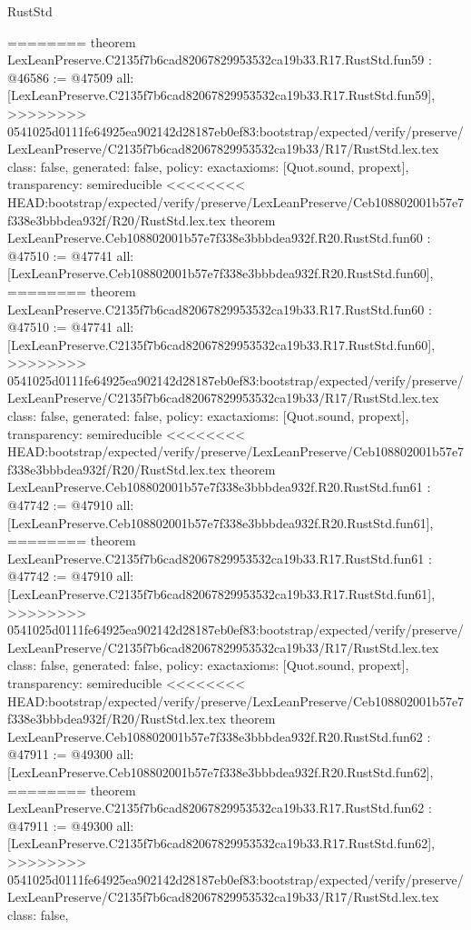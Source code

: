 \begin{lexlean}{RustStd}
\begin{coremodule}
{\begin{coremodule}
{{{{{{{{{{{{{{{{{{{{{{{{{{{{{{{{{{{{{{{{{{{{{{{{{{{{{{{{{{{{{{========
theorem LexLeanPreserve.C2135f7b6cad82067829953532ca19b33.R17.RustStd.fun59 : @46586 := @47509 {
  all: [LexLeanPreserve.C2135f7b6cad82067829953532ca19b33.R17.RustStd.fun59],
>>>>>>>> 0541025d0111fe64925ea902142d28187eb0ef83:bootstrap/expected/verify/preserve/LexLeanPreserve/C2135f7b6cad82067829953532ca19b33/R17/RustStd.lex.tex
  class: false,
  generated: false,
  policy: exact{axioms: [Quot.sound, propext]},
  transparency: semireducible
}
<<<<<<<< HEAD:bootstrap/expected/verify/preserve/LexLeanPreserve/Ceb108802001b57e7f338e3bbbdea932f/R20/RustStd.lex.tex
theorem LexLeanPreserve.Ceb108802001b57e7f338e3bbbdea932f.R20.RustStd.fun60 : @47510 := @47741 {
  all: [LexLeanPreserve.Ceb108802001b57e7f338e3bbbdea932f.R20.RustStd.fun60],
========
theorem LexLeanPreserve.C2135f7b6cad82067829953532ca19b33.R17.RustStd.fun60 : @47510 := @47741 {
  all: [LexLeanPreserve.C2135f7b6cad82067829953532ca19b33.R17.RustStd.fun60],
>>>>>>>> 0541025d0111fe64925ea902142d28187eb0ef83:bootstrap/expected/verify/preserve/LexLeanPreserve/C2135f7b6cad82067829953532ca19b33/R17/RustStd.lex.tex
  class: false,
  generated: false,
  policy: exact{axioms: [Quot.sound, propext]},
  transparency: semireducible
}
<<<<<<<< HEAD:bootstrap/expected/verify/preserve/LexLeanPreserve/Ceb108802001b57e7f338e3bbbdea932f/R20/RustStd.lex.tex
theorem LexLeanPreserve.Ceb108802001b57e7f338e3bbbdea932f.R20.RustStd.fun61 : @47742 := @47910 {
  all: [LexLeanPreserve.Ceb108802001b57e7f338e3bbbdea932f.R20.RustStd.fun61],
========
theorem LexLeanPreserve.C2135f7b6cad82067829953532ca19b33.R17.RustStd.fun61 : @47742 := @47910 {
  all: [LexLeanPreserve.C2135f7b6cad82067829953532ca19b33.R17.RustStd.fun61],
>>>>>>>> 0541025d0111fe64925ea902142d28187eb0ef83:bootstrap/expected/verify/preserve/LexLeanPreserve/C2135f7b6cad82067829953532ca19b33/R17/RustStd.lex.tex
  class: false,
  generated: false,
  policy: exact{axioms: [Quot.sound, propext]},
  transparency: semireducible
}
<<<<<<<< HEAD:bootstrap/expected/verify/preserve/LexLeanPreserve/Ceb108802001b57e7f338e3bbbdea932f/R20/RustStd.lex.tex
theorem LexLeanPreserve.Ceb108802001b57e7f338e3bbbdea932f.R20.RustStd.fun62 : @47911 := @49300 {
  all: [LexLeanPreserve.Ceb108802001b57e7f338e3bbbdea932f.R20.RustStd.fun62],
========
theorem LexLeanPreserve.C2135f7b6cad82067829953532ca19b33.R17.RustStd.fun62 : @47911 := @49300 {
  all: [LexLeanPreserve.C2135f7b6cad82067829953532ca19b33.R17.RustStd.fun62],
>>>>>>>> 0541025d0111fe64925ea902142d28187eb0ef83:bootstrap/expected/verify/preserve/LexLeanPreserve/C2135f7b6cad82067829953532ca19b33/R17/RustStd.lex.tex
  class: false,
}}}}}}}}}}}}}}}}}}}}}}}}}}}}}}}}}}}}}}}}}}}}}}}}}}}}}}}}}}}}}}}}}}
\end{coremodule}}
\end{coremodule}
\end{lexlean}
